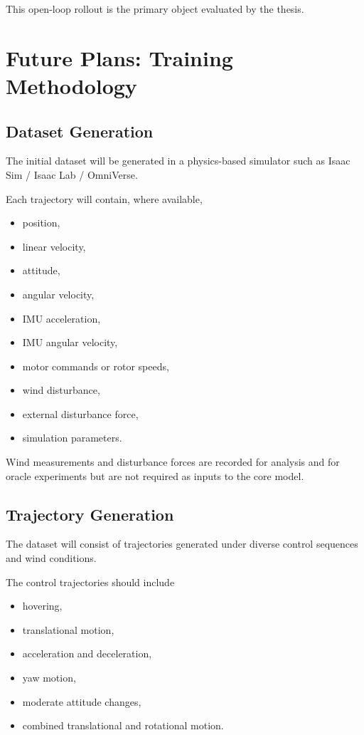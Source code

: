 \documentclass[conference]{IEEEtran}
\begin{document}
This open-loop rollout is the primary object evaluated by the thesis.


\section{Future Plans: Training Methodology}


\subsection{Dataset Generation}

The initial dataset will be generated in a physics-based simulator such
as Isaac Sim / Isaac Lab / OmniVerse.

Each trajectory will contain, where available,

\begin{itemize}
    \item position,
    \item linear velocity,
    \item attitude,
    \item angular velocity,
    \item IMU acceleration,
    \item IMU angular velocity,
    \item motor commands or rotor speeds,
    \item wind disturbance,
    \item external disturbance force,
    \item simulation parameters.
\end{itemize}

Wind measurements and disturbance forces are recorded for analysis and
for oracle experiments but are not required as inputs to the core
model.


\subsection{Trajectory Generation}

The dataset will consist of trajectories generated under diverse
control sequences and wind conditions.

The control trajectories should include

\begin{itemize}
    \item hovering,
    \item translational motion,
    \item acceleration and deceleration,
    \item yaw motion,
    \item moderate attitude changes,
    \item combined translational and rotational motion.
\end{itemize}
\end{document}
